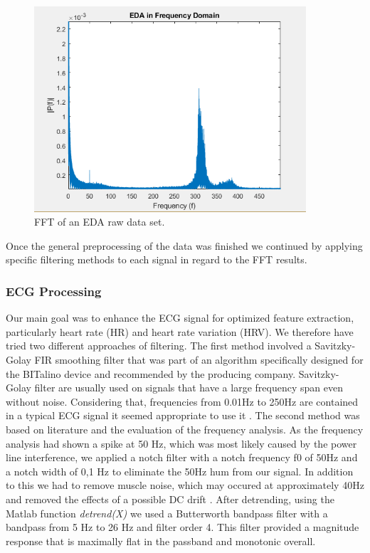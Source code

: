 \begin{figure}[ht]
\centering
\includegraphics[width=0.9\textwidth]{images/fftEDA.png}
\caption{FFT of an EDA raw data set.}
\label{fftEDAImg}
\end{figure}

Once the general preprocessing of the data was finished we continued by applying specific filtering methods to each signal in regard to the FFT results.

\subsubsection{ECG Processing}
Our main goal was to enhance the ECG signal for optimized feature extraction, particularly heart rate (HR) and heart rate variation (HRV). We therefore have tried two different approaches of filtering. The first method involved a Savitzky-Golay FIR smoothing filter that was part of an algorithm specifically designed for the BITalino device and recommended by the producing company. Savitzky-Golay filter are usually used on signals that have a large frequency span even without noise. Considering that, frequencies from 0.01Hz to 250Hz are contained in a typical ECG signal it seemed appropriate to use it \cite{tan2013digital}.
The second method was based on literature and the evaluation of the frequency analysis.
As the frequency analysis had shown a spike at 50 Hz, which was most likely caused by the power line interference, we applied a notch filter with a notch frequency f0 of 50Hz and a notch width of 0,1 Hz to eliminate the 50Hz hum from our signal.
In addition to this we had to remove muscle noise, which may occured at approximately 40Hz and removed the effects of a possible DC drift \cite{tan2013digital}.
After detrending, using the Matlab function \textit{detrend(X)} we used a Butterworth bandpass filter with a bandpass from 5 Hz to 26 Hz and filter order 4. This filter provided a magnitude response that is maximally flat in the passband and monotonic overall.  

